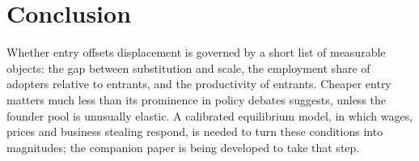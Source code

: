 \documentclass[11pt]{article}
\theoremstyle{remark}
\begin{document}
\section{Conclusion}

Whether entry offsets displacement is governed by a short list of measurable objects: the gap between substitution and scale, the employment share of adopters relative to entrants, and the productivity of entrants. Cheaper entry matters much less than its prominence in policy debates suggests, unless the founder pool is unusually elastic. A calibrated equilibrium model, in which wages, prices and business stealing respond, is needed to turn these conditions into magnitudes; the companion paper is being developed to take that step.



\end{document}
